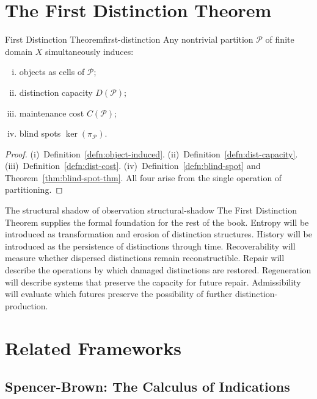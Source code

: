 \documentclass[12pt,twoside,openright]{book}
\newcommand{\partition}{\mathcal{P}}
\begin{document}
\section{The First Distinction Theorem}
\label{sec:ch1-fdt}

\begin{theorem}{First Distinction Theorem}{first-distinction}
  Any nontrivial partition $\partition$ of finite domain
  $X$ simultaneously induces:
  \begin{enumerate}[(i)]
    \item objects as cells of $\partition$;
    \item distinction capacity $D(\partition)$;
    \item maintenance cost $C(\partition)$;
    \item blind spots $\ker(\pi_\partition)$.
  \end{enumerate}
\end{theorem}

\begin{proof}
  (i)~Definition~\ref{defn:object-induced}.
  (ii)~Definition~\ref{defn:dist-capacity}.
  (iii)~Definition~\ref{defn:dist-cost}.
  (iv)~Definition~\ref{defn:blind-spot}
  and Theorem~\ref{thm:blind-spot-thm}.
  All four arise from the single operation of partitioning.
\end{proof}

\begin{remark}{The structural shadow of observation}%
  {structural-shadow}
  The First Distinction Theorem supplies the formal
  foundation for the rest of the book. Entropy will be
  introduced as transformation and erosion of distinction
  structures. History will be introduced as the persistence
  of distinctions through time. Recoverability will measure
  whether dispersed distinctions remain reconstructible.
  Repair will describe the operations by which damaged
  distinctions are restored. Regeneration will describe
  systems that preserve the capacity for future repair.
  Admissibility will evaluate which futures preserve the
  possibility of further distinction-production.
\end{remark}

\section{Related Frameworks}
\label{sec:ch1-related-frameworks}

\subsection*{Spencer-Brown: The Calculus of Indications}
\end{document}
